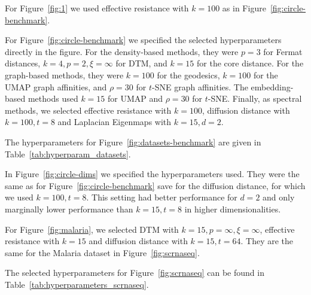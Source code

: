 \documentclass{article}
\theoremstyle{plain}
\theoremstyle{definition}
\theoremstyle{remark}
\begin{document}
For Figure~\ref{fig:1} we used effective resistance with $k=100$ as in Figure~\ref{fig:circle-benchmark}.

For Figure~\ref{fig:circle-benchmark} we specified the selected hyperparameters directly in the figure. For the density-based methods, they were $p=3$ for Fermat distances, $k=4, p=2, \xi=\infty$ for DTM, and $k=15$ for the core distance. For the graph-based methods, they were $k=100$ for the geodesics, $k=100$ for the UMAP graph affinities, and $\rho=30$ for $t$-SNE graph affinities. The embedding-based methods used $k=15$ for UMAP and $\rho=30$ for $t$-SNE. Finally, as spectral methods, we selected effective resistance with $k=100$, diffusion distance with $k=100, t=8$ and Laplacian Eigenmaps with $k=15, d=2$. 

The hyperparameters for Figure~\ref{fig:datasets-benchmark} are given in Table~\ref{tab:hyperparam_datasets}.

In Figure~\ref{fig:circle-dims} we specified the hyperparameters used. They were the same as for Figure~\ref{fig:circle-benchmark} save for the diffusion distance, for which we used $k=100, t=8$. This setting had better performance for $d=2$ and only marginally lower performance than $k=15, t=8$ in higher dimensionalities.

For Figure~\ref{fig:malaria}, we selected DTM with $k=15, p=\infty, \xi=\infty$, effective resistance with $k=15$ and diffusion distance with $k=15, t=64$. They are the same for the Malaria dataset in Figure~\ref{fig:scrnaseq}.

The selected hyperparameters for Figure~\ref{fig:scrnaseq} can be found in Table~\ref{tab:hyperparameters_scrnaseq}.
\end{document}

